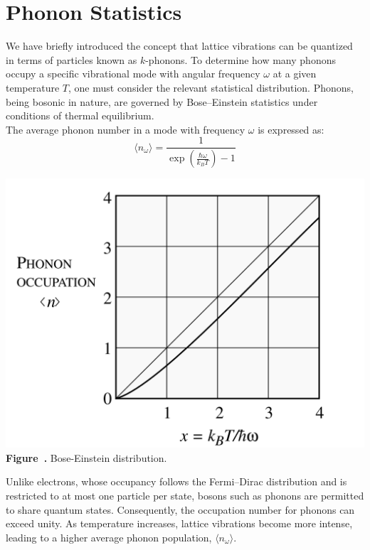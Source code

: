 \section{Phonon Statistics}
We have briefly introduced the concept that lattice vibrations can be quantized in terms of particles known as $k$-phonons. To determine how many phonons occupy a specific vibrational mode with angular frequency $\omega$ at a given temperature $T$, one must consider the relevant statistical distribution. Phonons, being bosonic in nature, are governed by Bose–Einstein statistics under conditions of thermal equilibrium.\\
The average phonon number in a mode with frequency $\omega$ is expressed as:
\begin{equation}
	\langle n_{\omega} \rangle = \frac{1}{\exp\left( \frac{\hbar \omega}{k_B T} \right) - 1}
\end{equation}
\begin{center}
	\begin{minipage}{0.5\textwidth}
		\centering
		\includegraphics[width=\textwidth]{img/BoseEinstein_distribution.png}
		\\[0.5em]
		\textbf{Figure~\thefigure.} Bose-Einstein distribution.
		\label{fig:BoseEinstein_distribution}
	\end{minipage}
\end{center}
Unlike electrons, whose occupancy follows the Fermi–Dirac distribution and is restricted to at most one particle per state, bosons such as phonons are permitted to share quantum states. Consequently, the occupation number for phonons can exceed unity. As temperature increases, lattice vibrations become more intense, leading to a higher average phonon population, $\langle n_{\omega} \rangle$.\\
